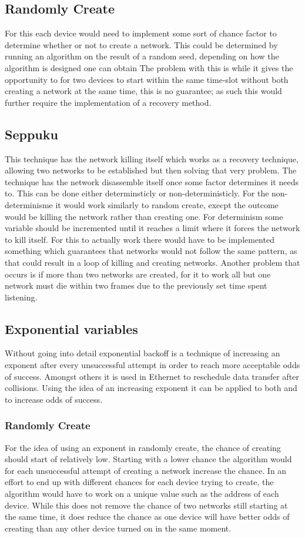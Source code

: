 \subsection{Randomly Create}\label{RCreate}
For this each device would need to implement some sort of chance factor to determine whether or not to create a network.
This could be determined by running an algorithm on the result of a random seed, depending on how the algorithm is designed one can obtain
The problem with this is while it gives the opportunity to for two devices to start within the same time-slot without both creating a network at the same time, this is no guarantee; as such this would further require the implementation of a recovery method.

\subsection{Seppuku}\label{KtN}
This technique has the network killing itself which works as a recovery technique, allowing two networks to be established but then solving that very problem.
The technique has the network disassemble itself once some factor determines it needs to.
This can be done either determinsticly or non-deterministicly.
For the non-determinisme it would work similarly to random create, execpt the outcome would be killing the network rather than creating one.
For determinism some variable should be incremented until it reaches a limit where it forces the network to kill itself.
For this to actually work there would have to be implemented something which guarantees that networks would not follow the same pattern, as that could result in a loop of killing and creating networks.
Another problem that occurs is if more than two networks are created, for it to work all but one network must die within two frames due to the previously set time spent listening.

\subsection{Exponential variables}
Without going into detail exponential backoff is a technique of increasing an exponent after every unsuccessful attempt in order to reach more acceptable odds of success.
Amongst others it is used in Ethernet to reschedule data transfer after collisions. \citep{Ebackoff}
Using the idea of an increasing exponent it can be applied to both  and  to increase odds of success.
\subsubsection*{Randomly Create}
For the idea of using an exponent in randomly create, the chance of creating should start of relatively low.
Starting with a lower chance the algorithm would for each unsuccessful attempt of creating a network increase the chance.
In an effort to end up with different chances for each device trying to create, the algorithm would have to work on a unique value such as the address of each device.
While this does not remove the chance of two networks still starting at the same time, it does reduce the chance as one device will have better odds of creating than any other device turned on in the same moment.
